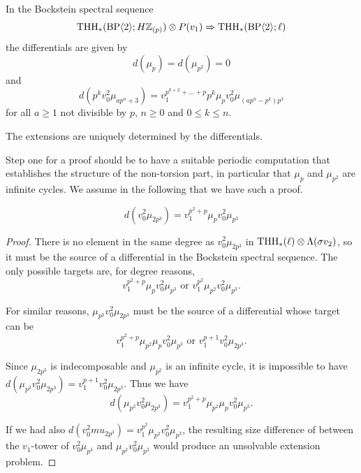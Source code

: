 \begin{conjecture}
  In the Bockstein spectral sequence
  \begin{equation}
    \operatorname{THH}_*(\mathrm{BP} \langle 2 \rangle; H \mathbb{Z}_{(p)}) \otimes P(v_1) \Rightarrow \operatorname{THH}_*(\mathrm{BP} \langle 2 \rangle; \ell)
  \end{equation}
  the differentials are given by
  \begin{equation}
    d(\mu_p) = d(\mu_{p^2}) = 0
  \end{equation}
  and
  \begin{equation}
    d(p^k v_0^2 \mu_{a p^n+3}) = v_1^{p^{k+2} + \dots + p}p^k \mu_p v_0^2 \mu_{(a p^n - p^k) p^3}
  \end{equation}
  for all $a \geq 1$ not divisible by $p$, $n \geq 0$ and $0 \leq k \leq n$.

  The extensions are uniquely determined by the differentials.
\end{conjecture}


Step one for a proof should be to have a suitable periodic computation that establishes the structure of the non-torsion part, in particular that $\mu_p$ and $\mu_{p^2}$ are infinite cycles. We assume in the following that we have such a proof.

\begin{proposition}
  \begin{equation}
    d(v_0^2 \mu_{2p^3}) = v_1^{p^2 + p} \mu_p v_0^2 \mu_{p^3}
  \end{equation}
\end{proposition}

\begin{proof}
  There is no element in the same degree as $v_0^2 \mu_{2p^3}$ in $\operatorname{THH}_*(\ell) \otimes \Lambda(\sigma v_2)$, so it must be the source of a differential in the Bockstein spectral sequence. The only possible targets are, for degree reasons,
  \begin{equation}
    v_1^{p^2 + p} \mu_p v_0^2 \mu_{p^3} \text{ or } v_1^{p^2} \mu_{p^2} v_0^2 \mu_{p^3}.
  \end{equation}

  For similar reasons, $\mu_{p^2} v_0^2 \mu_{2p^3}$ must be the source of a differential whose target can be
  \begin{equation}
    v_1^{p^2 + p} \mu_{p^2}\mu_p v_0^2 \mu_{p^3} \text{ or } v_1^{p+1} v_0^2 \mu_{2p^3}.
  \end{equation}

  Since $\mu_{2p^3}$ is indecomposable and $\mu_{p^2}$ is an infinite cycle, it is impossible to have $d(\mu_{p^2} v_0^2 \mu_{2p^3}) = v_1^{p+1}v_0^2 \mu_{2p^3}$. Thus we have
  \begin{equation}
    d(\mu_{p^2} v_0^2 \mu_{2p^3}) = v_1^{p^2 + p} \mu_{p^2}\mu_p v_0^2 \mu_{p^3}.
  \end{equation}

  If we had also $d(v_0^2mu_{2p^3}) = v_1^{p^2} \mu_{p^2} v_0^2 \mu_{p^3}$, the resulting size difference of between the $v_1$-tower of $v_0^2 \mu_{p^3}$ and $\mu_{p^2} v_0^2 \mu_{p^3}$ would produce an unsolvable extension problem.
\end{proof}
